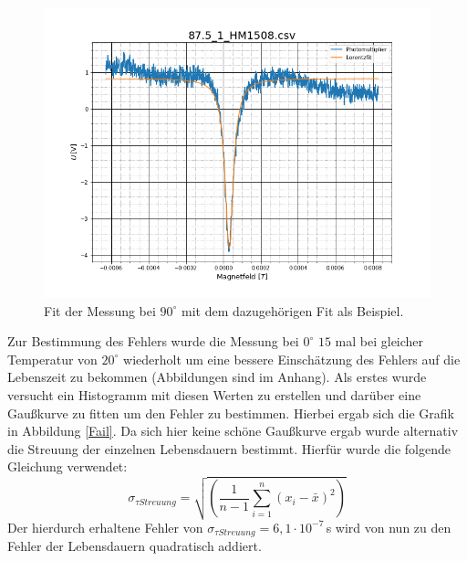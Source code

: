 \begin{figure}[ht]
	\includegraphics[scale=0.5]{Bild/90GradLorenz}
	\centering
	\caption[Fit der Lorentzkurve bei für 90Grad]{Fit der Messung bei $90^\circ$ mit dem dazugehörigen Fit als Beispiel.}
	\label{Lo90}
\end{figure}
\FloatBarrier
Zur Bestimmung des Fehlers wurde die Messung bei $0^\circ$ $15$ mal bei gleicher Temperatur von $20^\circ$ wiederholt um eine bessere Einschätzung des Fehlers auf die Lebenszeit zu bekommen (Abbildungen sind im Anhang). Als erstes wurde versucht ein Histogramm mit diesen Werten zu erstellen und darüber eine Gaußkurve zu fitten um den Fehler zu bestimmen. Hierbei ergab sich die Grafik in Abbildung \ref{Fail}. Da sich hier keine schöne Gaußkurve ergab wurde alternativ die Streuung der einzelnen Lebensdauern bestimmt. Hierfür wurde die folgende Gleichung verwendet:
\begin{equation}
	\sigma_{\tau Streuung}=\sqrt{\left(\frac{1}{n-1}\sum_{i=1}^{n}(x_i-\bar{x})^2\right)}
\end{equation}
Der hierdurch erhaltene Fehler  von $\sigma_{\tau Streuung}=6,1\cdot10^{-7}\,$s wird von nun zu den Fehler der Lebensdauern quadratisch addiert.
